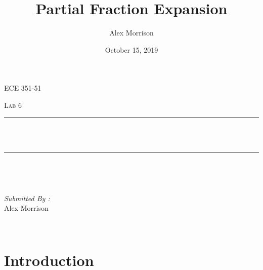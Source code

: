 \documentclass[12pt]{report}
\title{Partial Fraction Expansion}
\author{ Alex Morrison}
\date{October 15, 2019}
\makeatletter
\let\thetitle\@title
\makeatother
\begin{document}

\begin{titlepage}
	\centering
    \vspace*{0.5 cm}
\begin{center}    \textsc{\Large ECE 351-51}\\[2.0 cm]	\end{center}%
	\textsc{\Large  Lab 6}\\[0.5 cm]				%
	\rule{\linewidth}{0.2 mm} \\[0.4 cm]
	{ \huge \bfseries \thetitle}\\
	\rule{\linewidth}{0.2 mm} \\[1.5 cm]
	
	\begin{minipage}{0.4\textwidth}
		\begin{flushleft} \large
			\end{flushleft}
			\end{minipage}~
			\begin{minipage}{0.4\textwidth}
            
			\begin{flushright} \large
			\emph{Submitted By :} \\
			Alex Morrison  
		\end{flushright}
           
	\end{minipage}\\[2 cm]
	

    
    
    
    
	
\end{titlepage}


\tableofcontents
\pagebreak

\renewcommand{\thesection}{\arabic{section}}
\section{Introduction}
 
\end{document}
